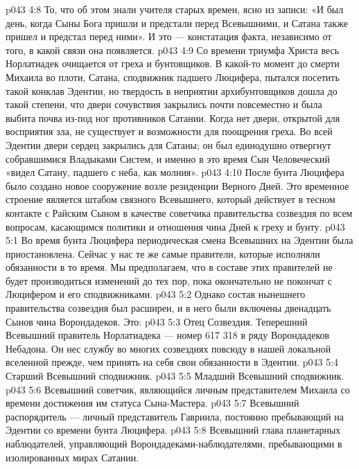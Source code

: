 \vs p043 4:8 То, что об этом знали учителя старых времен, ясно из записи: «И был день, когда Сыны Бога пришли и предстали перед Всевышними, и Сатана также пришел и предстал перед ними». И это --- констатация факта, независимо от того, в какой связи она появляется.
\vs p043 4:9 \pc Со времени триумфа Христа весь Норлатиадек очищается от греха и бунтовщиков. В какой\hyp{}то момент до смерти Михаила во плоти, Сатана, сподвижник падшего Люцифера, пытался посетить такой конклав Эдентии, но твердость в неприятии архибунтовщиков дошла до такой степени, что двери сочувствия закрылись почти повсеместно и была выбита почва из\hyp{}под ног противников Сатании. Когда нет двери, открытой для восприятия зла, не существует и возможности для поощрения греха. Во всей Эдентии двери сердец закрылись для Сатаны; он был единодушно отвергнут собравшимися Владыками Систем, и именно в это время Сын Человеческий «видел Сатану, падшего с неба, как молния».
\vs p043 4:10 После бунта Люцифера было создано новое сооружение возле резиденции Верного Дней. Это временное строение является штабом связного Всевышнего, который действует в тесном контакте с Райским Сыном в качестве советчика правительства созвездия по всем вопросам, касающимся политики и отношения чина Дней к греху и бунту.
\vs p043 5:1 Во время бунта Люцифера периодическая смена Всевышних на Эдентии была приостановлена. Сейчас у нас те же самые правители, которые исполняли обязанности в то время. Мы предполагаем, что в составе этих правителей не будет производиться изменений до тех пор, пока окончательно не покончат с Люцифером и его сподвижниками.
\vs p043 5:2 Однако состав нынешнего правительства созвездия был расширен, и в него были включены двенадцать Сынов чина Ворондадеков. Это:
\vs p043 5:3 \bibnobreakspace Отец Созвездия. Теперешний Всевышний правитель Норлатиадека --- номер 617 318 в ряду Ворондадеков Небадона. Он нес службу во многих созвездиях повсюду в нашей локальной вселенной прежде, чем принять на себя свои обязанности в Эдентии.
\vs p043 5:4 \pc {}\bibnobreakspace Старший Всевышний сподвижник.
\vs p043 5:5 \pc {}\bibnobreakspace Младший Всевышний сподвижник.
\vs p043 5:6 \pc {}\bibnobreakspace Всевышний советчик, являющийся личным представителем Михаила со времени достижения им статуса Сына\hyp{}Мастера.
\vs p043 5:7 \pc {}\bibnobreakspace Всевышний распорядитель --- личный представитель Гавриила, постоянно пребывающий на Эдентии со времени бунта Люцифера.
\vs p043 5:8 \pc {}\bibnobreakspace Всевышний глава планетарных наблюдателей, управляющий Ворондадеками\hyp{}наблюдателями, пребывающими в изолированных мирах Сатании.
